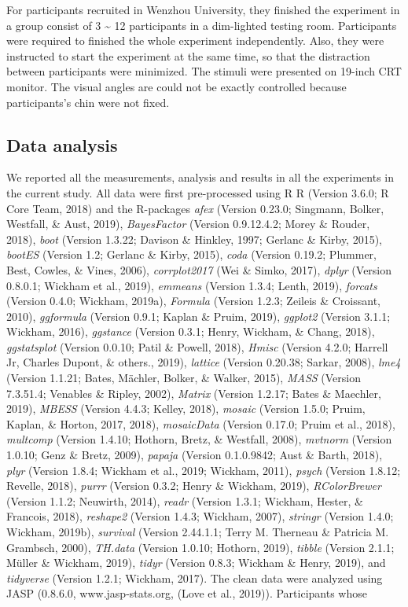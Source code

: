 \documentclass[man]{apa6}
\begin{document}
For participants recruited in Wenzhou University, they finished the experiment in a group consist of 3 \textasciitilde{} 12 participants in a dim-lighted testing room. Participants were required to finished the whole experiment independently. Also, they were instructed to start the experiment at the same time, so that the distraction between participants were minimized. The stimuli were presented on 19-inch CRT monitor. The visual angles are could not be exactly controlled because participants's chin were not fixed.

\hypertarget{data-analysis}{%
\subsection{Data analysis}\label{data-analysis}}

We reported all the measurements, analysis and results in all the experiments in the current study. All data were first pre-processed using R R (Version 3.6.0; R Core Team, 2018) and the R-packages \emph{afex} (Version 0.23.0; Singmann, Bolker, Westfall, \& Aust, 2019), \emph{BayesFactor} (Version 0.9.12.4.2; Morey \& Rouder, 2018), \emph{boot} (Version 1.3.22; Davison \& Hinkley, 1997; Gerlanc \& Kirby, 2015), \emph{bootES} (Version 1.2; Gerlanc \& Kirby, 2015), \emph{coda} (Version 0.19.2; Plummer, Best, Cowles, \& Vines, 2006), \emph{corrplot2017} (Wei \& Simko, 2017), \emph{dplyr} (Version 0.8.0.1; Wickham et al., 2019), \emph{emmeans} (Version 1.3.4; Lenth, 2019), \emph{forcats} (Version 0.4.0; Wickham, 2019a), \emph{Formula} (Version 1.2.3; Zeileis \& Croissant, 2010), \emph{ggformula} (Version 0.9.1; Kaplan \& Pruim, 2019), \emph{ggplot2} (Version 3.1.1; Wickham, 2016), \emph{ggstance} (Version 0.3.1; Henry, Wickham, \& Chang, 2018), \emph{ggstatsplot} (Version 0.0.10; Patil \& Powell, 2018), \emph{Hmisc} (Version 4.2.0; Harrell Jr, Charles Dupont, \& others., 2019), \emph{lattice} (Version 0.20.38; Sarkar, 2008), \emph{lme4} (Version 1.1.21; Bates, Mächler, Bolker, \& Walker, 2015), \emph{MASS} (Version 7.3.51.4; Venables \& Ripley, 2002), \emph{Matrix} (Version 1.2.17; Bates \& Maechler, 2019), \emph{MBESS} (Version 4.4.3; Kelley, 2018), \emph{mosaic} (Version 1.5.0; Pruim, Kaplan, \& Horton, 2017, 2018), \emph{mosaicData} (Version 0.17.0; Pruim et al., 2018), \emph{multcomp} (Version 1.4.10; Hothorn, Bretz, \& Westfall, 2008), \emph{mvtnorm} (Version 1.0.10; Genz \& Bretz, 2009), \emph{papaja} (Version 0.1.0.9842; Aust \& Barth, 2018), \emph{plyr} (Version 1.8.4; Wickham et al., 2019; Wickham, 2011), \emph{psych} (Version 1.8.12; Revelle, 2018), \emph{purrr} (Version 0.3.2; Henry \& Wickham, 2019), \emph{RColorBrewer} (Version 1.1.2; Neuwirth, 2014), \emph{readr} (Version 1.3.1; Wickham, Hester, \& Francois, 2018), \emph{reshape2} (Version 1.4.3; Wickham, 2007), \emph{stringr} (Version 1.4.0; Wickham, 2019b), \emph{survival} (Version 2.44.1.1; Terry M. Therneau \& Patricia M. Grambsch, 2000), \emph{TH.data} (Version 1.0.10; Hothorn, 2019), \emph{tibble} (Version 2.1.1; Müller \& Wickham, 2019), \emph{tidyr} (Version 0.8.3; Wickham \& Henry, 2019), and \emph{tidyverse} (Version 1.2.1; Wickham, 2017). The clean data were analyzed using JASP (0.8.6.0, www.jasp-stats.org, (Love et al., 2019)). Participants whose 
\end{document}
